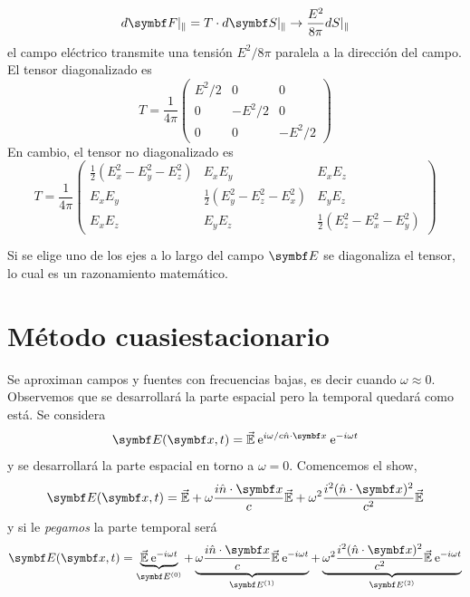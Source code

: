 \documentclass[10pt,oneside]{CBFT_book}
\begin{document}
\[
	d\vb{F}|_{\parallel} = T\cdot d\vb{S}|_{\parallel} \rightarrow \frac{E^2}{8\pi} dS|_{\parallel}
\]
el campo eléctrico transmite una tensión $E^2/8\pi$ paralela a la dirección del campo.
El tensor diagonalizado es 
\[
	T = \frac{1}{4\pi}\begin{pmatrix}
	        E^2/2	& 0 	& 0 \\
		0	& -E^2/2	& 0 \\
		0	& 0	& -E^2/2
	       \end{pmatrix}
\]
En cambio, el tensor no diagonalizado es
\[
	T = \frac{1}{4\pi}\begin{pmatrix}
	        \frac{1}{2}( E_x^2 - E_y^2 -E_z^2 ) & E_x E_y	& E_x E_z \\
		E_x E_y	& \frac{1}{2}( E_y^2 - E_z^2 -E_x^2 ) & E_y E_z \\
		E_x E_z & E_y E_z & \frac{1}{2}( E_z^2 - E_x^2 -E_y^2 )
	       \end{pmatrix}
\]

Si se elige uno de los ejes a lo largo del campo $\vb{E}$ se diagonaliza el tensor, lo cual es
un razonamiento matemático.

\section{Método cuasiestacionario}

Se aproximan campos y fuentes con frecuencias bajas, es decir cuando $\omega \approx 0$.
Observemos que se desarrollará la parte espacial pero la temporal quedará como está.
Se considera
\[
	\vb{E}(\vb{x},t) = \vec{\mathbb{E}} \euler^{i\omega/c \hat{n}\cdot\vb{x}} \euler^{-i\omega t}
\]
y se desarrollará la parte espacial en torno a $\omega=0$. Comencemos el show,
\[
	\vb{E}(\vb{x},t) = \vec{\mathbb{E}} + \omega\frac{i\hat{n}\cdot\vb{x}}{c} \vec{\mathbb{E}} +
			\omega^2 \frac{i^2(\hat{n}\cdot\vb{x})^2}{c^2} \vec{\mathbb{E}}
\]
y si le {\it pegamos} la parte temporal será
\[
	\vb{E}(\vb{x},t) = \underbrace{ \vec{\mathbb{E}} \euler^{-i\omega t} }_{\vb{E}^{(0)}} + 
	\underbrace{\omega\frac{i\hat{n}\cdot\vb{x}}{c} \vec{\mathbb{E}}\euler^{-i\omega t}}_{\vb{E}^{(1)}} +
	\underbrace{\omega^2\frac{i^2(\hat{n}\cdot\vb{x})^2}{c^2}\vec{\mathbb{E}}\euler^{-i\omega t}}_{\vb{E}^{(2)}}
\]
\end{document}

